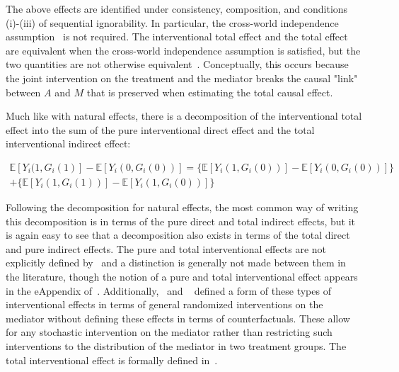 The above effects are identified under consistency, composition, and conditions (i)-(iii) of sequential ignorability. 
In particular, the cross-world independence assumption~\citep{vanderweeleetal2014} is not required. 
The interventional total effect and the total effect are equivalent when the cross-world independence
assumption is satisfied, but the two quantities are not otherwise equivalent~\citep{vanderweeleetal2014}.
Conceptually, this occurs because the joint intervention on the treatment and the mediator breaks the 
causal "link" between $A$ and $M$ that is preserved when estimating the total causal effect.


Much like with natural effects, there is a decomposition of the interventional total effect into the sum
of the pure interventional direct effect and the total interventional indirect effect: 

\begin{equation}
\begin{aligned}
	\mathbb{E}[Y_{i}(1,G_{i}(1)] - \mathbb{E}[Y_{i}(0,G_{i}(0))] = 
	\{\mathbb{E}[Y_{i}(1,G_{i}(0))] - \mathbb{E}[Y_{i}(0,G_{i}(0))]\}\\ 
	+ \{\mathbb{E}[Y_{i}(1,G_{i}(1))] - \mathbb{E}[Y_{i}(1,G_{i}(0))]\}
\end{aligned}
\end{equation}

Following the decomposition for natural effects, the most common way of writing this 
decomposition is in terms of the pure direct and total
indirect effects, but it is again easy to see that a decomposition also exists in terms of the total direct
and pure indirect effects. The pure and total interventional effects are not explicitly defined 
by~\cite{vanderweeleetal2014} and a distinction is generally not made between them in the literature, though 
the notion of a pure and total interventional effect appears in the eAppendix of~\cite{vanderweele2014}. 
Additionally,~\cite{didelez2006} and ~\cite{geneletti2007} defined a form of these types of
interventional effects in terms of general randomized interventions on the mediator without defining these
effects in terms of counterfactuals. These allow for any stochastic intervention on the mediator rather than
restricting such interventions to the distribution of the mediator in two treatment groups. The 
total interventional effect is formally defined in~\cite{linvanderweele2017}. 

